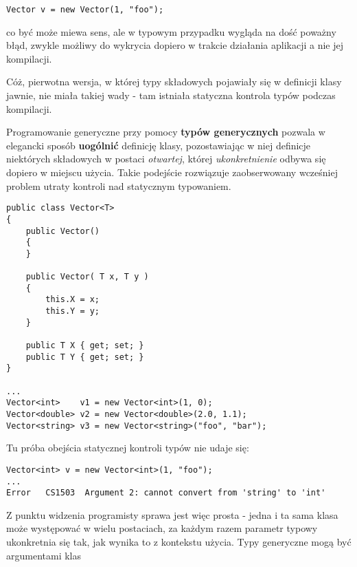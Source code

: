 \begin{scriptsize}
\begin{verbatim}
Vector v = new Vector(1, "foo");
\end{verbatim}
\end{scriptsize}

co być może miewa sens, ale w typowym przypadku wygląda na dość poważny błąd, zwykle możliwy do wykrycia dopiero
w trakcie działania aplikacji a nie jej kompilacji. 

Cóż, pierwotna wersja, w której typy składowych pojawiały się w definicji klasy jawnie, nie miała takiej wady -
tam istniała statyczna kontrola typów podczas kompilacji.

Programowanie generyczne przy pomocy {\bf typów generycznych} pozwala w elegancki sposób {\bf uogólnić} definicję
klasy, pozostawiając w niej definicje niektórych składowych w postaci {\em otwartej}, której {\em ukonkretnienie}
odbywa się dopiero w miejscu użycia. Takie podejście rozwiązuje zaobserwowany wcześniej problem utraty kontroli
nad statycznym typowaniem.

\begin{scriptsize}
\begin{verbatim}
public class Vector<T>
{
    public Vector()
    {
    }

    public Vector( T x, T y )
    {
        this.X = x;
        this.Y = y;
    }

    public T X { get; set; }
    public T Y { get; set; }
}

...
Vector<int>    v1 = new Vector<int>(1, 0);
Vector<double> v2 = new Vector<double>(2.0, 1.1);
Vector<string> v3 = new Vector<string>("foo", "bar");

\end{verbatim}
\end{scriptsize}

Tu próba obejścia statycznej kontroli typów nie udaje się:

\begin{scriptsize}
\begin{verbatim}
Vector<int> v = new Vector<int>(1, "foo");
...
Error	CS1503	Argument 2: cannot convert from 'string' to 'int'
\end{verbatim}
\end{scriptsize}

Z punktu widzenia programisty sprawa jest więc prosta - jedna i ta sama klasa może występować w wielu postaciach, za każdym
razem parametr typowy ukonkretnia się tak, jak wynika to z kontekstu użycia. Typy generyczne mogą być argumentami klas


